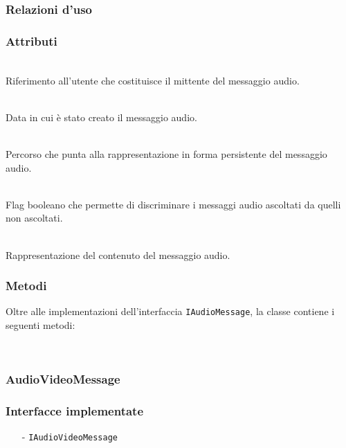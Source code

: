 \subsubsection*{Relazioni d'uso}

\subsubsection*{Attributi}
\begin{description}
  \item{}\\
Riferimento all'utente che costituisce il mittente del messaggio audio.
  \item{}\\
Data in cui è stato creato il messaggio audio.
  \item{}\\
Percorso che punta alla rappresentazione in forma persistente del messaggio audio.
  \item{}\\
Flag booleano che permette di discriminare i messaggi audio ascoltati da quelli non ascoltati.
  \item{}\\
Rappresentazione del contenuto del messaggio audio.
\end{description}

\subsubsection*{Metodi}
Oltre alle implementazioni dell'interfaccia \texttt{IAudioMessage}, la classe contiene i seguenti metodi:
\begin{description}
  \item{}\\
\end{description}

\subsubsection{AudioVideoMessage}\label{sec:audiovideomessage}

\subsubsection*{Interfacce implementate}
\begin{itemize}[noitemsep,nolistsep]
  \item[-]\texttt{IAudioVideoMessage}
\end{itemize}

